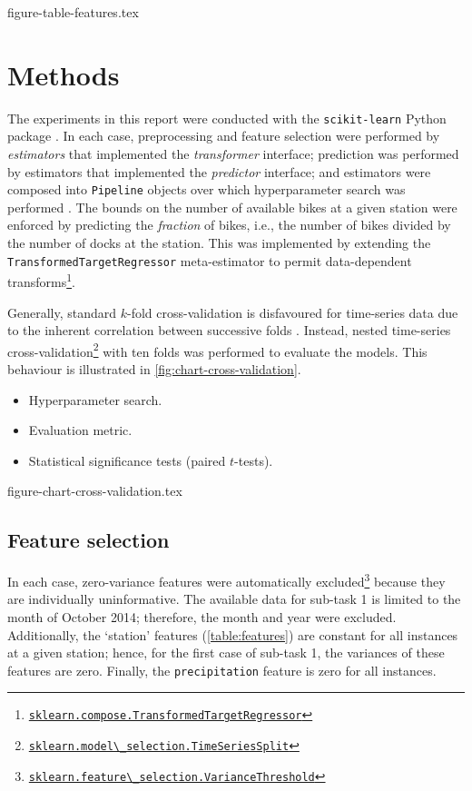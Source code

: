 \documentclass[11pt]{extarticle}
\newcommand{\sklearn}[1]{
  \href{https://scikit-learn.org/stable/modules/generated/sklearn.#1.html}{\lstinline|sklearn.#1|}
}
\begin{document}
{figure-table-features.tex}

\section{Methods}
\label{sec:methods}

The experiments in this report were conducted with the \texttt{scikit-learn} Python
package \parencite{Pedregosa2011}.
In each case, preprocessing and feature selection were performed by \emph{estimators}
that implemented the \emph{transformer} interface; prediction was performed by
estimators that implemented the \emph{predictor} interface; and estimators were
composed into \texttt{Pipeline} objects over which hyperparameter search was performed
\parencite[4-9]{Buitinck2013}.
The bounds on the number of available bikes at a given station were enforced by
predicting the \emph{fraction} of bikes, i.e., the number of bikes divided by the number
of docks at the station.
This was implemented by extending the \texttt{TransformedTargetRegressor} meta-estimator
to permit data-dependent
transforms\footnote{\sklearn{compose.TransformedTargetRegressor}}.

Generally, standard $k$-fold cross-validation is disfavoured for time-series data due
to the inherent correlation between successive folds \parencite{Bergmeir2018}.
Instead, nested time-series
cross-validation\footnote{\sklearn{model\_selection.TimeSeriesSplit}} with ten folds
was performed to evaluate the models.
This behaviour is illustrated in \cref{fig:chart-cross-validation}.

\begin{itemize}
  \item Hyperparameter search.
  \item Evaluation metric.
  \item Statistical significance tests (paired $t$-tests).
\end{itemize}

{figure-chart-cross-validation.tex}

\subsection{Feature selection}
\label{sec:feature-selection}

In each case, zero-variance features were automatically
excluded\footnote{\sklearn{feature\_selection.VarianceThreshold}} because they are
individually uninformative.
The available data for sub-task 1 is limited to the month of October 2014; therefore,
the month and year were excluded.
Additionally, the `station' features (\cref{table:features}) are constant for all
instances at a given station; hence, for the first case of sub-task 1, the variances of
these features are zero.
Finally, the \texttt{precipitation} feature is zero for all instances.
\end{document}
